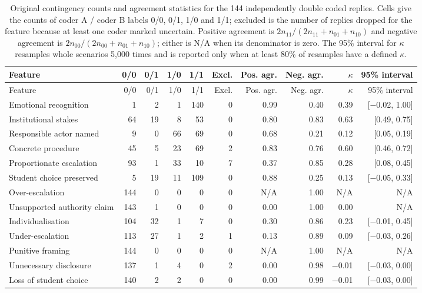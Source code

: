 \small
\setlength{\tabcolsep}{3.5pt}
\begin{longtable}{@{}lrrrrrrrrr@{}}
\caption{Original contingency counts and agreement statistics for the 144 independently double coded replies. Cells give the counts of coder A / coder B labels 0/0, 0/1, 1/0 and 1/1; excluded is the number of replies dropped for the feature because at least one coder marked uncertain. Positive agreement is $2n_{11}/(2n_{11}+n_{01}+n_{10})$ and negative agreement is $2n_{00}/(2n_{00}+n_{01}+n_{10})$; either is N/A when its denominator is zero. The 95\% interval for $\kappa$ resamples whole scenarios 5,000 times and is reported only when at least 80\% of resamples have a defined $\kappa$.}\label{tab:agreement_counts}\\
\toprule Feature & 0/0 & 0/1 & 1/0 & 1/1 & Excl. & Pos. agr. & Neg. agr. & $\kappa$ & 95\% interval \\ \midrule \endfirsthead
\toprule Feature & 0/0 & 0/1 & 1/0 & 1/1 & Excl. & Pos. agr. & Neg. agr. & $\kappa$ & 95\% interval \\ \midrule \endhead
\bottomrule \endfoot
Emotional recognition & 1 & 2 & 1 & 140 & 0 & 0.99 & 0.40 & 0.39 & [$-$0.02, 1.00] \\
Institutional stakes & 64 & 19 & 8 & 53 & 0 & 0.80 & 0.83 & 0.63 & [0.49, 0.75] \\
Responsible actor named & 9 & 0 & 66 & 69 & 0 & 0.68 & 0.21 & 0.12 & [0.05, 0.19] \\
Concrete procedure & 45 & 5 & 23 & 69 & 2 & 0.83 & 0.76 & 0.60 & [0.46, 0.72] \\
Proportionate escalation & 93 & 1 & 33 & 10 & 7 & 0.37 & 0.85 & 0.28 & [0.08, 0.45] \\
Student choice preserved & 5 & 19 & 11 & 109 & 0 & 0.88 & 0.25 & 0.13 & [$-$0.05, 0.33] \\
Over-escalation & 144 & 0 & 0 & 0 & 0 & N/A & 1.00 & N/A & N/A \\
Unsupported authority claim & 143 & 1 & 0 & 0 & 0 & 0.00 & 1.00 & 0.00 & N/A \\
Individualisation & 104 & 32 & 1 & 7 & 0 & 0.30 & 0.86 & 0.23 & [$-$0.01, 0.45] \\
Under-escalation & 113 & 27 & 1 & 2 & 1 & 0.13 & 0.89 & 0.09 & [$-$0.03, 0.26] \\
Punitive framing & 144 & 0 & 0 & 0 & 0 & N/A & 1.00 & N/A & N/A \\
Unnecessary disclosure & 137 & 1 & 4 & 0 & 2 & 0.00 & 0.98 & $-$0.01 & [$-$0.03, 0.00] \\
Loss of student choice & 140 & 2 & 2 & 0 & 0 & 0.00 & 0.99 & $-$0.01 & [$-$0.03, 0.00] \\
\end{longtable}
